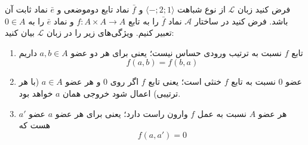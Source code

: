 فرض کنید زبان
$\mathcal{L}$
از نوع شباهت
$\langle\mathord{-};2;1\rangle$
و
$\bar f$
نماد تابع دوموضعی
و
$\bar e$
نماد ثابت آن باشد. فرض کنید در ساختار
$\mathcal{A}$
نماد
$\bar f$
را به تابع
$f\colon A\times A\to A$
و نماد
$\bar e$
را به
$0\in A$
تعبیر کنیم.
ویژگی‌های زیر را در زبان
$\mathcal{L}$
بیان کنید:
\begin{enumerate}[label=(\alph*)]
    \item تابع $f$ نسبت به ترتیب ورودی حساس نیست؛ یعنی برای هر دو عضو
    $a,b\in A$
    داریم
    \[ f(a, b) = f(b, a) \]
    \item عضو $0$ نسبت به تابع $f$ خنثی است؛ یعنی تابع $f$ اگر روی
    $0$
    و هر عضو $a\in A$
    (با هر ترتیبی)
    اعمال شود خروجی همان $a$ خواهد بود.
    \item هر عضو
    $A$ نسبت به عمل $f$ وارون راست دارد؛ یعنی برای هر عضو $a$ عضو $a'$ هست که
    \[ f(a, a') = 0 \]
\end{enumerate}

